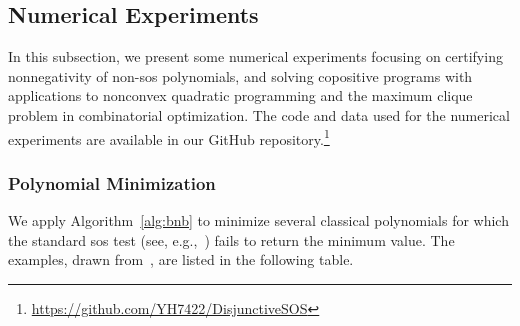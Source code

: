 \documentclass[12pt]{article}
\newcommand{\reals}{\mathbb{R}}
\newcommand{\mcS}{\mathcal{S}}
\newcommand{\mbS}{\mathbb{S}}
\newcommand{\mcT}{\mathcal{T}}
\theoremstyle{remark}
\begin{document}

\subsection{Numerical Experiments}\label{sec:num}
In this subsection, we present some numerical experiments focusing on certifying nonnegativity of non-sos polynomials, and solving copositive programs with applications to nonconvex quadratic programming and the maximum clique problem in combinatorial optimization. 
The code and data used for the numerical experiments are available in our GitHub repository.\footnote{\url{https://github.com/YH7422/DisjunctiveSOS}}
\subsubsection{Polynomial Minimization}\label{sec:num_poly}
We apply Algorithm~\ref{alg:bnb} to minimize 
several classical polynomials for which the standard sos test (see, e.g.,~\cite{Parrilo2003}) fails to return the minimum value. The examples, drawn from~\cite{Reznick2000, Delzell1980, ahmadi2017sum}, are listed in the following table. 
\end{document}
